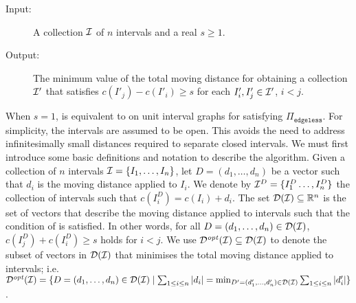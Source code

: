 \begin{itembox}[l]{\idisp}
    \begin{description}%
        \item[Input:] A collection $\mathcal{I}$ of $n$ intervals and a real $s \ge 1$.
        \item[Output:] The minimum value of the total moving distance for obtaining a collection $\mathcal{I}'$ that satisfies $c(I'_j)-c(I'_i) \ge s$ for each $I'_i, I'_j \in \mathcal{I}'$, $i<j$.
    \end{description}
\end{itembox}
\fi
When $s = 1$, {\idisp} is equivalent to {\gged} on unit interval graphs for satisfying $\Pi_{\texttt{edgeless}}$.
%
%
For simplicity, the intervals are assumed to be open. This avoids the need to address infinitesimally small distances required to separate closed intervals.
%
We must first introduce some basic definitions and notation to describe the algorithm.
Given a collection of $n$ intervals $\mathcal{I}= \{I_1,\ldots,I_{n}\}$, let $D = (d_1,\ldots,d_{n})$ be a vector such that $d_i$ is the moving distance applied to $I_i$. 
We denote by $\mathcal{I}^D = \{I^D_1\ldots, I^D_{n}\}$ the collection of intervals such that $c(I^D_i) = c(I_i) +d_i$.
The set $\mathcal{D}(\mathcal{I}) \subseteq \mathbb{R}^n$ is the set of vectors that describe the moving distance applied to intervals such that the condition of {\idisp} is satisfied. 
In other words, for all $D = (d_1,\ldots,d_n) \in \mathcal{D}(\mathcal{I})$, $c(I^D_{j})+c(I^D_{i}) \ge s$ holds for $i < j$.
We use $\mathcal{D}^{\mathit{opt}}(\mathcal{I}) \subseteq \mathcal{D}(\mathcal{I})$ to denote the subset of vectors in $\mathcal{D}(\mathcal{I})$ that minimises the total moving distance applied to intervals; i.e. $\mathcal{D}^{\mathit{opt}}(\mathcal{I}) = \{D=(d_1,\ldots,d_n) \in \mathcal{D}(\mathcal{I})\mid \sum_{1\le i \le n} |d_i| = \min_{D' = (d'_1,\ldots,d'_n) \in \mathcal{D}(\mathcal{I})}{\sum_{1\le i \le n}|d'_i|}\}$.

